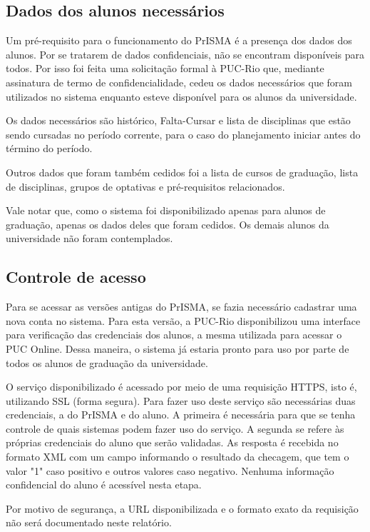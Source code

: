 \documentclass[graduacao,brazil]{ThesisPUC}
\begin{document}
\subsection{Dados dos alunos necessários}

Um pré-requisito para o funcionamento do PrISMA é a presença dos dados dos alunos. Por se tratarem de dados confidenciais, não se encontram disponíveis para todos. Por isso foi feita uma solicitação formal à PUC-Rio que, mediante assinatura de termo de confidencialidade, cedeu os dados necessários que foram utilizados no sistema enquanto esteve disponível para os alunos da universidade. 

Os dados necessários são histórico, Falta-Cursar e lista de disciplinas que estão sendo cursadas no período corrente, para o caso do planejamento iniciar antes do término do período. 

Outros dados que foram também cedidos foi a lista de cursos de graduação, lista de disciplinas, grupos de optativas e pré-requisitos relacionados. 

Vale notar que, como o sistema foi disponibilizado apenas para alunos de graduação, apenas os dados deles que foram cedidos. Os demais alunos da universidade não foram contemplados.

\subsection{Controle de acesso}

Para se acessar as versões antigas do PrISMA, se fazia necessário cadastrar uma nova conta no sistema. Para esta versão, a PUC-Rio disponibilizou uma interface para verificação das credenciais dos alunos, a mesma utilizada para acessar o PUC Online. Dessa maneira, o sistema já estaria pronto para uso por parte de todos os alunos de graduação da universidade. 

O serviço disponibilizado é acessado por meio de uma requisição HTTPS, isto é, utilizando SSL (forma segura). Para fazer uso deste serviço são necessárias duas credenciais, a do PrISMA e do aluno. A primeira é necessária para que se tenha controle de quais sistemas podem fazer uso do serviço. A segunda se refere às próprias credenciais do aluno que serão validadas. As resposta é recebida no formato XML com um campo informando o resultado da checagem, que tem o valor "1" caso positivo e outros valores caso negativo. Nenhuma informação confidencial do aluno é acessível nesta etapa. 

Por motivo de segurança, a URL disponibilizada e o formato exato da requisição não será documentado neste relatório.
\end{document}
